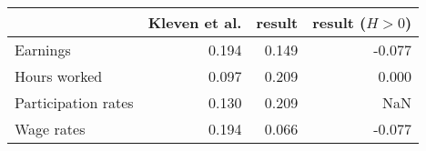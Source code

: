 \begin{tabular}{lrrr}
\toprule
                     &  Kleven et al. &  result &  result ($H > 0$) \\
\midrule
            Earnings &          0.194 &   0.149 &            -0.077 \\
        Hours worked &          0.097 &   0.209 &             0.000 \\
 Participation rates &          0.130 &   0.209 &               NaN \\
          Wage rates &          0.194 &   0.066 &            -0.077 \\
\bottomrule
\end{tabular}
